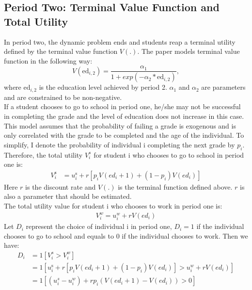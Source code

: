 \documentclass{handoutForSolutions}
\begin{document}
\subsection{Period Two: Terminal Value Function and Total Utility}
In period two, the dynamic problem ends and students reap a terminal utility defined by the terminal value function $V(.)$. The paper models terminal value function in the following way:
$$
V(\mathrm{e}\mathrm{d}_{i,2})=\frac{\alpha_ 1}{1+exp(-\alpha_2*\mathrm{e}\mathrm{d}_{i,2})},
$$
where $\mathrm{e}\mathrm{d}_{i,2}$ is the education level achieved by period 2. $\alpha_1$ and $\alpha_2$ are parameters and are constrained to be non-negative.\\
If a student chooses to go to school in period one, he/she may not be successful in completing the grade and the level of education does not increase in this case. This model assumes that the probability of failing a grade is exogenous and is only correlated with the grade to be completed and the age of the individual. To simplify, I denote the probability of individual i completing the next grade by $p_i$. Therefore, the total utility $V_i^s$ for student i who chooses to go to school in period one is:
\begin{equation*}
\begin{split}
    V_{i}^{\mathrm{s}}&=u_{i}^\mathrm{s}+r[p_{i}V(ed_i+1)+(1-p_{i})V(ed_i)]
\end{split}
\end{equation*}
Here $r$ is the discount rate and $V(.)$ is the terminal function defined above. $r$ is also a parameter that should be estimated.\\
The total utility value for student i who chooses to work in period one is:
\begin{equation*}
\begin{split}
     V_{i}^{w}=u_i^w+r V(ed_i)
\end{split}
\end{equation*}
Let $D_i$ represent the choice of individual i in period one, $D_i =1$ if the individual chooses to go to school and equals to 0 if the individual chooses to work. Then we have:
\begin{equation*}
\begin{split}
  D_i&=1[V_i^s>V_i^w]\\
    &=1[u_{i}^\mathrm{s}+r[p_{i}V(ed_i+1)+(1-p_{i})V(ed_i)]>u_i^w+rV(ed_i)]\\
    &=1[(u_i^s-u_i^w)+rp_i(V(ed_i+1)-V(ed_i))>0]
\end{split}
\end{equation*}
\end{document}
